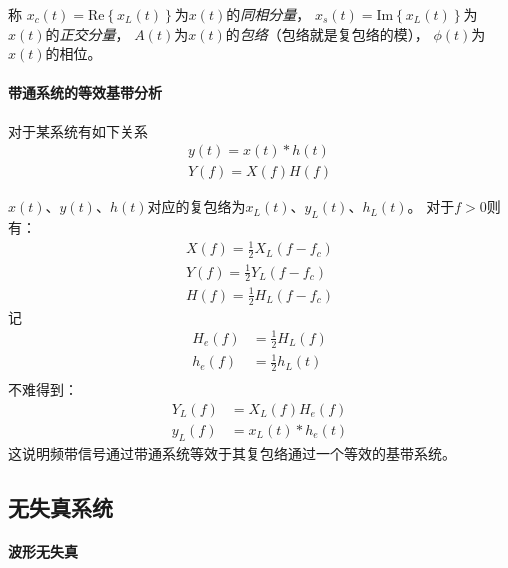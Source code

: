     称
    $x_c(t)=\text{Re}\left\{x_L(t)\right\}$为$x(t)$的\emph{同相分量}，
    $x_s(t)=\text{Im}\left\{x_L(t)\right\}$为$x(t)$的\emph{正交分量}，
    $A(t)$为$x(t)$的\emph{包络}（包络就是复包络的模），
    $\phi(t)$为$x(t)$的相位。

    \paragraph{带通系统的等效基带分析}\mbox{}

    对于某系统有如下关系
    \begin{equation}
        \begin{split}
            y(t)=x(t)*h(t)\\
            Y(f)=X(f)H(f)
        \end{split}
    \end{equation}

    $x(t)$、$y(t)$、$h(t)$对应的复包络为$x_L(t)$、$y_L(t)$、$h_L(t)$。
    对于$f>0$则有：
    \begin{equation}
        \begin{split}
            X(f)=\frac12X_L(f-f_c)\\
            Y(f)=\frac12Y_L(f-f_c)\\
            H(f)=\frac12H_L(f-f_c)
        \end{split}
    \end{equation}
    记
    \begin{equation}
        \begin{split}
            H_e(f)&=\frac12H_L(f)\\
            h_e(f)&=\frac12h_L(t)\\
        \end{split}
    \end{equation}
    不难得到：
    \begin{equation}
        \begin{split}
            Y_L(f)&=X_L(f)H_e(f)\\
            y_L(f)&=x_L(t)*h_e(t)
        \end{split}
    \end{equation}
    这说明频带信号通过带通系统等效于其复包络通过一个等效的基带系统。

\subsection{无失真系统}
    \paragraph{波形无失真}\mbox{}

